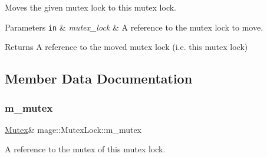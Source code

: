 Moves the given mutex lock to this mutex lock.


\begin{DoxyParams}[1]{Parameters}
\mbox{\tt in}  & {\em mutex\+\_\+lock} & A reference to the mutex lock to move. \\
\hline
\end{DoxyParams}
\begin{DoxyReturn}{Returns}
A reference to the moved mutex lock (i.\+e. this mutex lock) 
\end{DoxyReturn}


\subsection{Member Data Documentation}
\hypertarget{classmage_1_1_mutex_lock_a1c796e1e66bd49007fe746d1425b82f4}{}\label{classmage_1_1_mutex_lock_a1c796e1e66bd49007fe746d1425b82f4} 
\subsubsection{\texorpdfstring{m\+\_\+mutex}{m\_mutex}}
{\footnotesize\ttfamily \hyperlink{classmage_1_1_mutex}{Mutex}\& mage\+::\+Mutex\+Lock\+::m\+\_\+mutex\hspace{0.3cm}{\ttfamily [private]}}

A reference to the mutex of this mutex lock. 